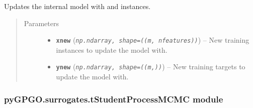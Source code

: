 \documentclass[letterpaper,10pt,english]{sphinxmanual}
\begin{document}
\begin{fulllineitems}
\begin{fulllineitems}
\end{fulllineitems}


\begin{fulllineitems}
\label{pyGPGO.surrogates.tStudentProcess:pyGPGO.surrogates.tStudentProcess.tStudentProcess.update}
Updates the internal model with  and  instances.
\begin{quote}\begin{description}
\item[{Parameters}] \leavevmode\begin{itemize}
\item {} 
\textbf{\texttt{xnew}} (\emph{\texttt{np.ndarray, shape=((m, nfeatures))}}) -- New training instances to update the model with.

\item {} 
\textbf{\texttt{ynew}} (\emph{\texttt{np.ndarray, shape=((m,))}}) -- New training targets to update the model with.

\end{itemize}

\end{description}\end{quote}

\end{fulllineitems}


\end{fulllineitems}



\subsubsection{pyGPGO.surrogates.tStudentProcessMCMC module}
\label{pyGPGO.surrogates.tStudentProcessMCMC:module-pyGPGO.surrogates.tStudentProcessMCMC}\label{pyGPGO.surrogates.tStudentProcessMCMC:pygpgo-surrogates-tstudentprocessmcmc-module}\label{pyGPGO.surrogates.tStudentProcessMCMC::doc}
\end{document}
